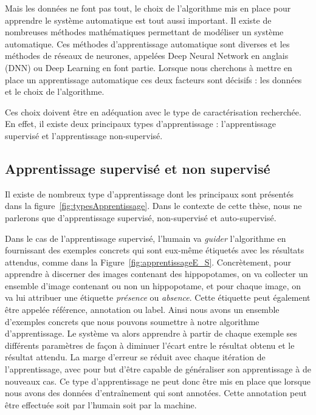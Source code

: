 Mais les données ne font pas tout, le choix de l'algorithme mis en place pour apprendre le système automatique est tout aussi important. Il existe de nombreuses méthodes mathématiques permettant de modéliser un système automatique. Ces méthodes d'apprentissage automatique sont diverses et les méthodes de réseaux de neurones, appelées Deep Neural Network en anglais (DNN) ou Deep Learning en font partie.
Lorsque nous cherchons à mettre en place un apprentissage automatique ces deux facteurs sont décisifs : les données et le choix de l'algorithme.

Ces choix doivent être en adéquation avec le type de caractérisation recherchée. En effet, il existe deux principaux types d'apprentissage : l'apprentissage supervisé et l'apprentissage non-supervisé.

\subsection{Apprentissage supervisé et non supervisé}

Il existe de nombreux type d'apprentissage dont les principaux sont présentés dans la figure~\ref{fig:typesApprentissage}. Dans le contexte de cette thèse, nous ne parlerons que d'apprentissage supervisé, non-supervisé et auto-supervisé.

Dans le cas de l'apprentissage supervisé, l'humain va \textit{guider} l’algorithme en fournissant des exemples concrets qui sont eux-même étiquetés avec les résultats attendus, comme dans la Figure~\ref{fig:apprentissageE_S}. Concrètement, pour apprendre à discerner des images contenant des hippopotames, on va collecter un ensemble d'image contenant ou non un hippopotame, et pour chaque image, on va lui attribuer une étiquette \textit{présence} ou \textit{absence}. Cette étiquette peut également être appelée référence, annotation ou label. Ainsi nous avons un ensemble d'exemples concrets que nous pouvons soumettre à notre algorithme d'apprentissage.
Le système va alors apprendre à partir de chaque exemple ses différents paramètres de façon à diminuer l’écart entre le résultat obtenu et le résultat attendu. La marge d’erreur se réduit avec chaque itération de l'apprentissage, avec pour but d’être capable de généraliser son apprentissage à de nouveaux cas. Ce type d'apprentissage ne peut donc être mis en place que lorsque nous avons des données d’entraînement qui sont annotées. Cette annotation peut être effectuée soit par l'humain soit par la machine.



